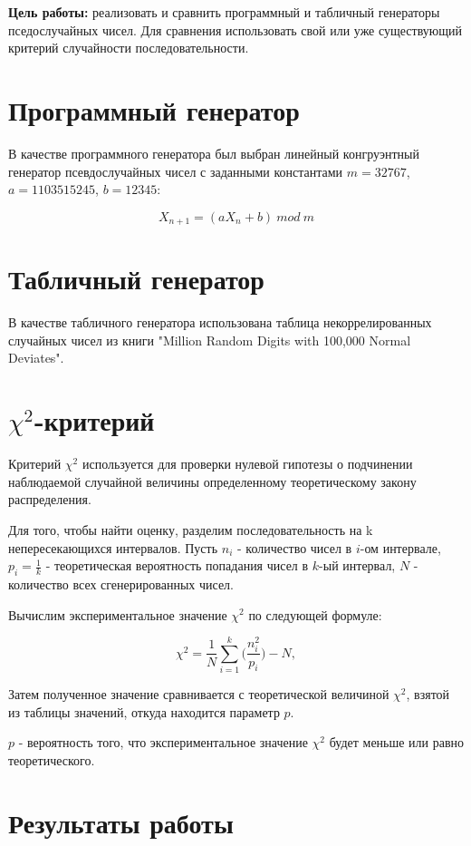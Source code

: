 \documentclass[a4paper, 14pt]{article}
\begin{document}
	\textbf{Цель работы:} реализовать и сравнить программный и табличный генераторы пседослучайных чисел. Для сравнения использовать свой или уже существующий критерий случайности последовательности. \\
	
	
	\section*{Программный генератор}
	
	В качестве программного генератора был выбран линейный конгруэнтный генератор псевдослучайных чисел с заданными константами $m = 32767$, $a = 1103515245$, $b = 12345$:
	
$$X_{n+1} =  (aX_n + b)  \: mod  \: m$$
	

\section*{Табличный генератор}

В качестве табличного генератора использована таблица некоррелированных случайных чисел из книги "Million Random Digits with 100,000 Normal Deviates". 

\section*{$\chi^2$-критерий}

Критерий $\chi^2$ используется для проверки нулевой гипотезы о подчинении наблюдаемой случайной величины определенному теоретическому закону распределения.

Для того, чтобы найти оценку, разделим последовательность на k непересекающихся интервалов. Пусть $n_i$ - количество чисел в $i$-ом интервале, $p_i = \frac{1}{k}$ - теоретическая вероятность попадания чисел в $k$-ый интервал, $N$ - количество всех сгенерированных чисел.

Вычислим экспериментальное значение $\chi^2$ по следующей формуле:

        $$\chi^2 = \frac{1}{N} \sum_{i=1}^k \bigg( \frac{n_i^2}{p_i} \bigg) - N,$$

Затем полученное значение сравнивается с теоретической величиной $\chi^2$, взятой из таблицы значений, откуда находится параметр $p$.

$p$ - вероятность того, что экспериментальное значение $\chi^2$ будет меньше или равно теоретического.


\section*{Результаты работы}
\end{document}
